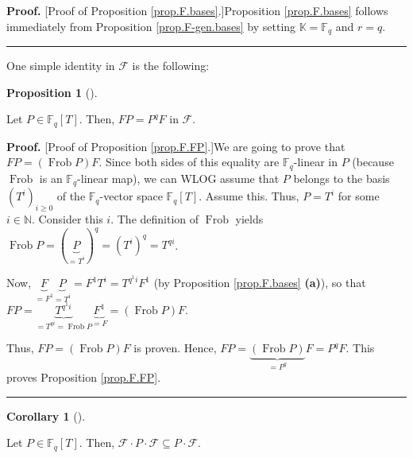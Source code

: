 \documentclass[numbers=enddot,12pt,final,onecolumn,notitlepage]{scrartcl}%
\theoremstyle{definition}
\newtheorem{prop}[theo]{Proposition}
\newenvironment{proposition}[1][]
{\begin{prop}[#1]\begin{leftbar}}
{\end{leftbar}\end{prop}}
\newtheorem{coro}[theo]{Corollary}
\newenvironment{corollary}[1][]
{\begin{coro}[#1]\begin{leftbar}}
{\end{leftbar}\end{coro}}
\newenvironment{proof}[1][Proof]{\noindent\textbf{#1.} }{\ \rule{0.5em}{0.5em}}
\begin{document}
\begin{proof}
[Proof of Proposition \ref{prop.F.bases}.]Proposition \ref{prop.F.bases}
follows immediately from Proposition \ref{prop.F-gen.bases} by setting
$\mathbb{K}=\mathbb{F}_{q}$ and $r=q$.
\end{proof}

One simple identity in $\mathcal{F}$ is the following:

\begin{proposition}
\label{prop.F.FP}Let $P\in\mathbb{F}_{q}\left[  T\right]  $. Then, $FP=P^{q}F$
in $\mathcal{F}$.
\end{proposition}

\begin{proof}
[Proof of Proposition \ref{prop.F.FP}.]We are going to prove that $FP=\left(
\operatorname*{Frob}P\right)  F$. Since both sides of this equality are
$\mathbb{F}_{q}$-linear in $P$ (because $\operatorname*{Frob}$ is an
$\mathbb{F}_{q}$-linear map), we can WLOG assume that $P$ belongs to the basis
$\left(  T^{i}\right)  _{i\geq0}$ of the $\mathbb{F}_{q}$-vector space
$\mathbb{F}_{q}\left[  T\right]  $. Assume this. Thus, $P=T^{i}$ for some
$i\in\mathbb{N}$. Consider this $i$. The definition of $\operatorname*{Frob}$
yields $\operatorname*{Frob}P=\left(  \underbrace{P}_{=T^{i}}\right)
^{q}=\left(  T^{i}\right)  ^{q}=T^{qi}$.

Now, $\underbrace{F}_{=F^{1}}\underbrace{P}_{=T^{i}}=F^{1}T^{i}=T^{q^{1}%
i}F^{1}$ (by Proposition \ref{prop.F.bases} \textbf{(a)}), so that
$FP=\underbrace{T^{q^{1}i}}_{=T^{qi}=\operatorname*{Frob}P}\underbrace{F^{1}%
}_{=F}=\left(  \operatorname*{Frob}P\right)  F$.

Thus, $FP=\left(  \operatorname*{Frob}P\right)  F$ is proven. Hence,
$FP=\underbrace{\left(  \operatorname*{Frob}P\right)  }_{=P^{q}}F=P^{q}F$.
This proves Proposition \ref{prop.F.FP}.
\end{proof}

\begin{corollary}
\label{cor.F.FPF}Let $P\in\mathbb{F}_{q}\left[  T\right]  $. Then,
$\mathcal{F}\cdot P\cdot\mathcal{F}\subseteq P\cdot\mathcal{F}$.
\end{corollary}
\end{document}
